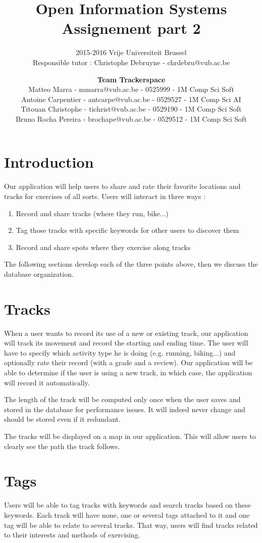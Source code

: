 \documentclass[a4paper]{article}
\title{\textbf{Open Information Systems\\Assignement part 2}}
\subtitle{2015-2016 Vrije Universiteit Brussel\\Responsible tutor : Christophe Debruyne - chrdebru@vub.ac.be}
\author{\textbf{Team Trackerspace}\\Matteo Marra - mmarra@vub.ac.be - 0525999 - 1M Comp Sci Soft\\Antoine Carpentier - antcarpe@vub.ac.be - 0529527 - 1M Comp Sci AI\\Titouan Christophe - tichrist@vub.ac.be - 0529190 - 1M Comp Sci Soft\\Bruno Rocha Pereira - brochape@vub.ac.be - 0529512 - 1M Comp Sci Soft}
\begin{document}
\maketitle

\section{Introduction}

Our application will help users to share and rate their favorite locations and tracks for exercises of all sorts. Users will interact in three ways : 

\begin{enumerate}
    \item Record and share tracks (where they run, bike...)
    \item Tag those tracks with specific keywords for other users to discover them
    \item Record and share spots where they exercise along tracks
\end{enumerate}

The following sections develop each of the three points above, then we discuss
the database organization.

\section{Tracks}

When a user wants to record its use of a new or existing track, our application will track its movement and record the starting and ending time. The user will have to specify which activity type he is doing (e.g. running, biking...) and optionally rate their record (with a grade and a review). Our application will be able to determine if the user is using a new track, in which case, the application will record it automatically.

The length of the track will be computed only once when the user saves and stored in the database for performance issues. It will indeed never change and should be stored even if it redundant.

The tracks will be displayed on a map in our application. This will allow users to clearly see the path the track follows.

\section{Tags}

Users will be able to tag tracks with keywords and search tracks based on these keywords. Each track will have none, one or several tags attached to it and one tag will be able to relate to several tracks. That way, users will find tracks related to their interests and methods of exercising.
\end{document}
